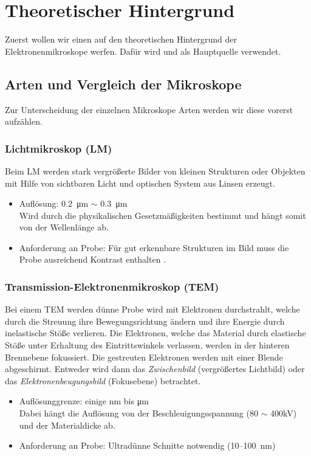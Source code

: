 
\chapter{Theoretischer Hintergrund}
\label{chap:fvz}
Zuerst wollen wir einen auf den theoretischen Hintergrund der Elektronenmikroskope werfen. Dafür wird \citep{RasterEM} und \citep{Anleitung} als Hauptquelle verwendet.
\section{Arten und Vergleich der Mikroskope}
\label{sec:artenEM}
Zur Unterscheidung der einzelnen Mikroskope Arten werden wir diese vorerst aufzählen.

\subsection*{Lichtmikroskop (LM)}
Beim LM werden stark vergrößerte Bilder von kleinen Strukturen oder Objekten mit Hilfe von sichtbaren Licht und optischen System aus Linsen erzeugt.
\begin{itemize}
    \item Auflösung: \SI{0,2}{\micro\metre} $\sim$ \SI{0,3}{\micro\metre}\\
    Wird durch die physikalischen Gesetzmäßigkeiten bestimmt und hängt somit von der Wellenlänge ab. 
    \item Anforderung an Probe: Für gut erkennbare Strukturen im Bild muss die Probe ausreichend Kontrast enthalten \citep{WikiLM}.
\end{itemize}

\subsection*{Transmission-Elektronenmikroskop (TEM)}
Bei einem TEM werden dünne Probe wird mit Elektronen durchstrahlt, welche durch die Streuung ihre Bewegungsrichtung ändern und ihre Energie durch inelastische Stöße verlieren. Die Elektronen, welche das Material durch elastische Stöße unter Erhaltung des Eintrittswinkels verlassen, werden in der hinteren Brennebene fokussiert. Die gestreuten Elektronen werden mit einer Blende abgeschirmt. Entweder wird dann das \textit{Zwischenbild} (vergrößertes Lichtbild) oder das \textit{Elektronenbeugungsbild} (Fokusebene) betrachtet. 
\begin{itemize}
    \item Auflösunggrenze: einige \si{\nano\metre} bis \si{\micro\metre}\\
    Dabei hängt die Auflösung von der Beschleuigungsspannung (80 $\sim$ 400\si{\kilo\volt}) und der Materialdicke ab. 
    \item Anforderung an Probe: Ultradünne Schnitte notwendig (10–\SI{100}{\nano\metre}) \citep{WikiTEM}
\end{itemize}
\newpage
